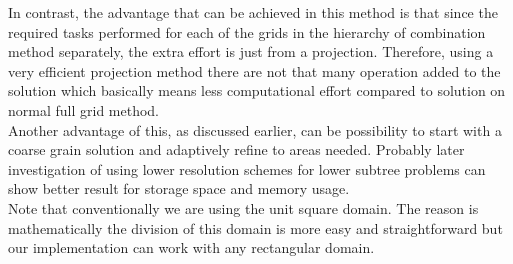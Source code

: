 In contrast, the advantage that can be achieved in this method is that since the required tasks performed for each of the grids in the hierarchy of combination method separately, the extra effort is just from a projection. Therefore, using a very efficient projection method there are not that many operation added to the solution which basically means less computational effort compared to solution on normal full grid method.\\
Another advantage of this, as discussed earlier, can be possibility to start with a coarse grain solution and adaptively refine to areas needed. Probably later investigation of using lower resolution schemes for lower subtree problems can show better result for storage space and memory usage. \\
Note that conventionally we are using the unit square domain. The reason is mathematically the division of this domain is more easy and straightforward but our implementation can work with any rectangular domain. 

